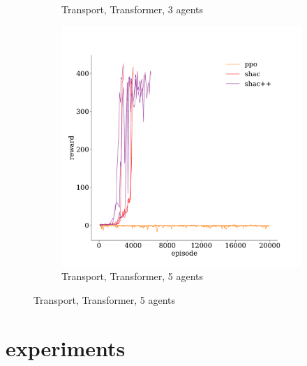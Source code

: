 \begin{figure}[t]
\begin{subfigure}[b]{0.32\textwidth}
        \caption{Transport, Transformer, 3 agents}
        \label{fig:transport-transformer-3}
    \end{subfigure}
    \begin{subfigure}[b]{0.32\textwidth}
        \includegraphics[width=\textwidth]{figs/transport-5-transformer.pdf}
        \caption{Transport, Transformer, 5 agents}
        \label{fig:transport-transformer-5}
    \end{subfigure}

\end{figure}

\section{experiments}\label{sect:experiments}


